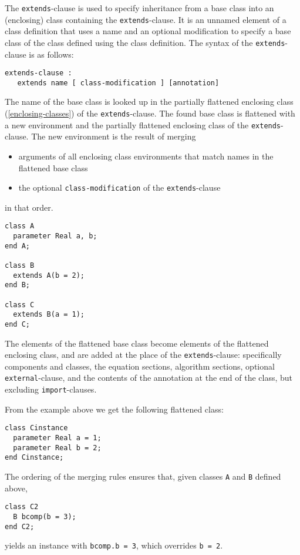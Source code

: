 The \lstinline!extends!-clause is used to specify inheritance from a base class into an (enclosing) class containing the \lstinline!extends!-clause.
It is an unnamed element of a class definition that uses a name and an optional modification to specify a base class of the class defined using the class definition.
The syntax of the \lstinline!extends!-clause is as follows:
\begin{lstlisting}[language=grammar]
extends-clause :
   extends name [ class-modification ] [annotation]
\end{lstlisting}%
The name of the base class is looked up in the partially flattened enclosing class (\cref{enclosing-classes}) of the \lstinline!extends!-clause.
The found base class is flattened with a new environment and the partially flattened enclosing class of the \lstinline!extends!-clause.
The new environment is the result of merging
\begin{itemize}
\item
  arguments of all enclosing class environments that match names in the flattened base class
\item
  the optional \lstinline!class-modification! of the \lstinline!extends!-clause
\end{itemize}
in that order.

\begin{example}
\begin{lstlisting}[language=modelica]
class A
  parameter Real a, b;
end A;

class B
  extends A(b = 2);
end B;

class C
  extends B(a = 1);
end C;
\end{lstlisting}
\end{example}

The elements of the flattened base class become elements of the flattened enclosing class, and are added at the place of the \lstinline!extends!-clause: specifically components and classes, the equation sections, algorithm sections, optional \lstinline!external!-clause, and the contents of the annotation at the end of the class, but excluding \lstinline!import!-clauses.

\begin{nonnormative}
From the example above we get the following flattened class:
\begin{lstlisting}[language=modelica]
class Cinstance
  parameter Real a = 1;
  parameter Real b = 2;
end Cinstance;
\end{lstlisting}

The ordering of the merging rules ensures that, given classes \lstinline!A! and \lstinline!B! defined above,
\begin{lstlisting}[language=modelica]
class C2
  B bcomp(b = 3);
end C2;
\end{lstlisting}
yields an instance with \lstinline!bcomp.b = 3!, which overrides \lstinline!b = 2!.
\end{nonnormative}

